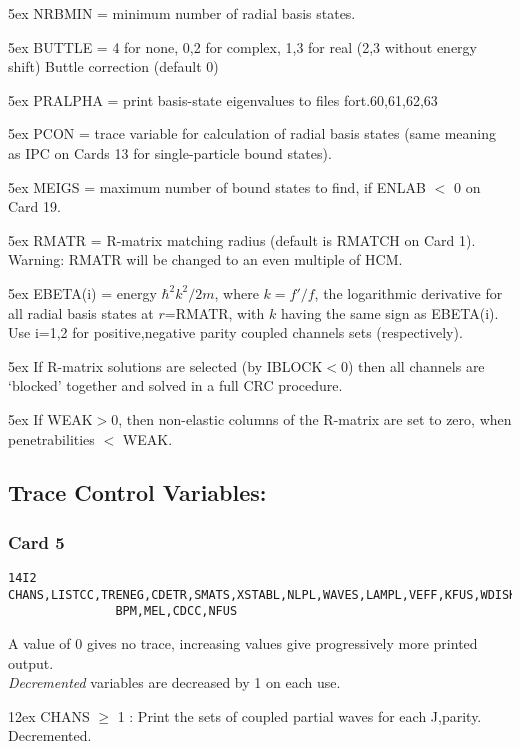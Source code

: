 \documentclass[11pt]{article}
\begin{document}
\hangindent 5ex
NRBMIN = minimum number of radial basis states.

\hangindent 5ex
BUTTLE = 4 for none, 0,2 for complex, 1,3 for real
(2,3 without energy shift) Buttle correction (default 0)

\hangindent 5ex
PRALPHA = print basis-state eigenvalues to files fort.60,61,62,63

\hangindent 5ex
PCON = trace variable for calculation of radial basis states (same
meaning as IPC on Cards 13 for single-particle bound states).

\hangindent 5ex
MEIGS = maximum number of bound states to find, if ENLAB $<$ 0 on Card 19.

\hangindent 5ex
RMATR = R-matrix matching radius (default is RMATCH on Card 1).
Warning: RMATR will be changed to an even multiple of HCM.

\hangindent 5ex
EBETA(i) = energy $\hbar^2k^2/2m$, where $k= f'/f$, the logarithmic derivative
for all radial basis states at $r$=RMATR, with $k$ having the same
sign as EBETA(i). Use i=1,2 for positive,negative parity coupled channels
sets (respectively).

\hangindent 5ex
If R-matrix solutions are selected (by IBLOCK$<$0) then all channels
are `blocked' together and solved in a full CRC procedure.

\hangindent 5ex
If WEAK$>$0, then non-elastic columns of the R-matrix are set to zero,
  when penetrabilities $<$ WEAK.


\subsection{Trace Control Variables:}
%
\subsubsection*{Card 5}
\begin{verbatim}
14I2
CHANS,LISTCC,TRENEG,CDETR,SMATS,XSTABL,NLPL,WAVES,LAMPL,VEFF,KFUS,WDISK,
               BPM,MEL,CDCC,NFUS
\end{verbatim}
A value of 0 gives no trace,
increasing values give progressively more printed output.
\\
{\em Decremented} variables are decreased by 1 on each use.

\bigskip

\hangindent 12ex
CHANS  $\geq$ 1 : Print the sets of coupled partial waves for each J,parity.
Decremented.
\end{document}
